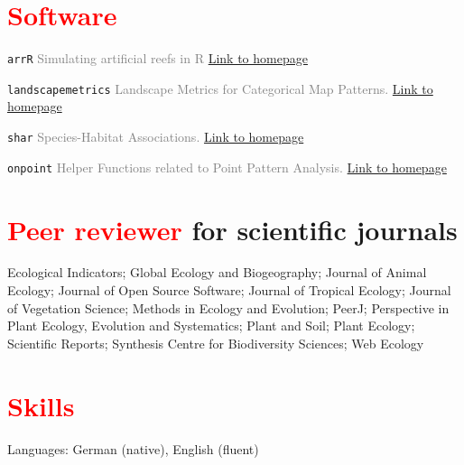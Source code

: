\documentclass[hidelinks]{report}
\begin{document}

\section*{\textcolor{red}{Software} \sout{\hfill}}

\texttt{arrR} \textcolor{grey}{Simulating artificial reefs in R}
\hfill
\textcolor{blue}{\href{https://allgeier-lab.github.io/arrR/}{Link to homepage}}

\texttt{landscapemetrics} \textcolor{grey}{Landscape Metrics for Categorical Map Patterns.}
\hfill
\textcolor{blue}{\href{https://r-spatialecology.github.io/landscapemetrics/}{Link to homepage}}

\texttt{shar} \textcolor{grey}{Species-Habitat Associations.}
\hfill
\textcolor{blue}{\href{https://r-sptialecology.github.io/shar/}{Link to homepage}}

\texttt{onpoint} \textcolor{grey}{Helper Functions related to Point Pattern Analysis.}
\hfill
\textcolor{blue}{\href{https://r-spatialecology.github.io/onpoint/}{Link to homepage}}


\section*{\textcolor{red}{Peer reviewer} for scientific journals \sout{\hfill}}

Ecological Indicators;
Global Ecology and Biogeography;
Journal of Animal Ecology;
Journal of Open Source Software;
Journal of Tropical Ecology;
Journal of Vegetation Science;
Methods in Ecology and Evolution;
PeerJ;
Perspective in Plant Ecology, Evolution and Systematics;
Plant and Soil;
Plant Ecology;
Scientific Reports;
Synthesis Centre for Biodiversity Sciences;
Web Ecology


\section*{\textcolor{red}{Skills} \sout{\hfill}}

Languages: German (native), English (fluent)

\vspace{7.5mm}
\end{document}
